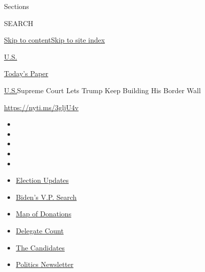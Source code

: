 Sections

SEARCH

\protect\hyperlink{site-content}{Skip to
content}\protect\hyperlink{site-index}{Skip to site index}

\href{https://www.nytimes.com/section/us}{U.S.}

\href{https://myaccount.nytimes.com/auth/login?response_type=cookie\&client_id=vi}{}

\href{https://www.nytimes.com/section/todayspaper}{Today's Paper}

\href{/section/us}{U.S.}\textbar{}Supreme Court Lets Trump Keep Building
His Border Wall

\url{https://nyti.ms/3gljU4v}

\begin{itemize}
\item
\item
\item
\item
\item
\end{itemize}

\begin{itemize}
\item
  \href{https://www.nytimes.com/2020/07/31/us/elections/biden-vs-trump.html?action=click\&pgtype=Article\&state=default\&region=TOP_BANNER\&context=storylines_menu}{Election
  Updates}
\item
  \href{https://www.nytimes.com/article/biden-vice-president-2020.html?action=click\&pgtype=Article\&state=default\&region=TOP_BANNER\&context=storylines_menu}{Biden's
  V.P. Search}
\item
  \href{https://www.nytimes.com/interactive/2020/07/24/us/politics/trump-biden-campaign-donors.html?action=click\&pgtype=Article\&state=default\&region=TOP_BANNER\&context=storylines_menu}{Map
  of Donations}
\item
  \href{https://www.nytimes.com/interactive/2020/us/elections/delegate-count-primary-results.html?action=click\&pgtype=Article\&state=default\&region=TOP_BANNER\&context=storylines_menu}{Delegate
  Count}
\item
  \href{https://www.nytimes.com/interactive/2019/us/politics/2020-presidential-candidates.html?action=click\&pgtype=Article\&state=default\&region=TOP_BANNER\&context=storylines_menu}{The
  Candidates}
\item
  \href{https://www.nytimes.com/newsletters/politics?action=click\&pgtype=Article\&state=default\&region=TOP_BANNER\&context=storylines_menu}{Politics
  Newsletter}
\end{itemize}

